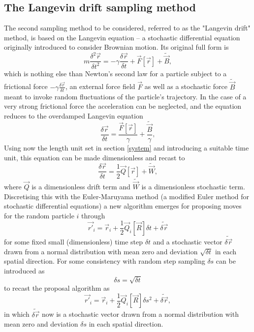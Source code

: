 \documentclass[a4paper,8pt]{article}
\begin{document}
\begin{multicols}{2}
\subsection{The Langevin drift sampling method}

The second sampling method to be considered, referred to as the "Langevin drift" method, is based on the Langevin equation – a stochastic differential equation originally introduced to consider Brownian motion. Its original full form is
\begin{equation}
m\frac{\delta^2\vec{r}}{\delta t^2} = -\gamma\frac{\delta\vec{r}}{\delta t}+\vec{F}[\vec{r}]+\widetilde{\vec{B}}, \label{originalLangevin}
\end{equation}
which is nothing else than Newton's second law for a particle subject to a frictional force $-\gamma\frac{\delta\vec{r}}{\delta t}$, an external force field $\vec{F}$ as well as a stochastic force $\widetilde{\vec{B}}$ meant to invoke random fluctuations of the particle's trajectory. In the case of a very strong frictional force the acceleration can be neglected, and the equation reduces to the overdamped Langevin equation
\begin{equation}
\frac{\delta\vec{r}}{\delta t} = \frac{\vec{F}[\vec{r}]}{\gamma}+\frac{\widetilde{\vec{B}}}{\gamma}, \label{overdampedLangevin}
\end{equation}
Using now the length unit set in section \ref{system} and introducing a suitable time unit, this equation can be made dimensionless and recast to
\begin{equation}
\frac{\delta\vec{r}}{\delta t} = \frac{1}{2}\vec{Q}[\vec{r}]+\widetilde{\vec{W}}, \label{Langevin}
\end{equation}
where $\vec{Q}$ is a dimensionless drift term and $\widetilde{\vec{W}}$ is a dimensionless stochastic term. Discretising this with the Euler-Maruyama method (a modified Euler method for stochastic differential equations) a new algorithm emerges for proposing moves for the random particle $i$ through
\begin{equation}
\vec{r'}_i = \vec{r}_i+\frac{1}{2}\vec{Q}_i[\vec{R}]\delta t + \widetilde{\delta\vec{r}}
\end{equation}
for some fixed small (dimensionless) time step $\delta t$ and a stochastic vector $\widetilde{\delta\vec{r}}$ drawn from a normal distribution with mean zero and deviation $\sqrt{\delta t}$ in each spatial direction. For some consistency with random step sampling $\delta s$ can be introduced as
\begin{equation}
\delta s = \sqrt{\delta t}
\end{equation}
to recast the proposal algorithm as
\begin{equation}
\vec{r'}_i = \vec{r}_i+\frac{1}{2}\vec{Q}_i[\vec{R}]\delta s^2 + \widetilde{\delta\vec{r}}, \label{propLD}
\end{equation}
in which $\widetilde{\delta\vec{r}}$ now is a stochastic vector drawn from a normal distribution with mean zero and deviation $\delta s$ in each spatial direction.


\end{multicols}
\end{document}
